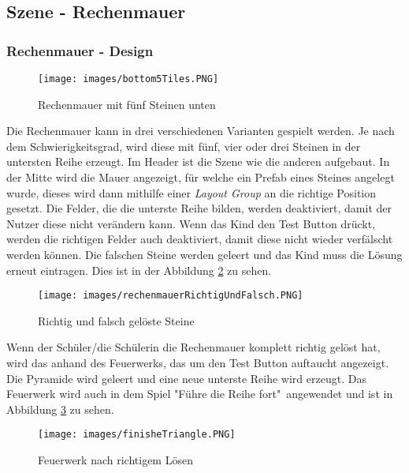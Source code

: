 \subsection{Szene - Rechenmauer}
\subsubsection{Rechenmauer - Design}
\begin{figure}[htbp]
  \centering
  \texttt{[image: images/bottom5Tiles.PNG]}
  \caption{Rechenmauer mit fünf Steinen unten}
  \label{triangle}
\end{figure}
Die Rechenmauer kann in drei verschiedenen Varianten gespielt werden. Je nach dem Schwierigkeitsgrad, wird diese mit fünf, vier oder drei Steinen in der untersten Reihe erzeugt. Im Header ist die Szene wie die anderen aufgebaut. In der Mitte wird die Mauer angezeigt, für welche ein Prefab eines Steines angelegt wurde, dieses wird dann mithilfe einer \textit{Layout Group} an die richtige Position gesetzt. Die Felder, die die unterste Reihe bilden, werden deaktiviert, damit der Nutzer diese nicht verändern kann. Wenn das Kind den Test Button drückt, werden die richtigen Felder auch deaktiviert, damit diese nicht wieder verfälscht werden können. Die falschen Steine werden geleert und das Kind muss die Lösung erneut eintragen. Dies ist in der Abbildung \ref{wrongAndRightStone} zu sehen.\\
\begin{figure}[htbp]
  \centering
  \texttt{[image: images/rechenmauerRichtigUndFalsch.PNG]}
  \caption{Richtig und falsch gelöste Steine}
  \label{wrongAndRightStone}
\end{figure}
Wenn der Schüler/die Schülerin die Rechenmauer komplett richtig gelöst hat, wird das anhand des Feuerwerks, das um den Test Button auftaucht angezeigt. Die Pyramide wird geleert und eine neue unterste Reihe wird erzeugt. Das Feuerwerk wird auch in dem Spiel "Führe die Reihe fort"\ angewendet und ist in Abbildung \ref{firework} zu sehen.
\begin{figure}[htbp]
  \centering
  \texttt{[image: images/finisheTriangle.PNG]}
  \caption{Feuerwerk nach richtigem Lösen}
  \label{firework}
\end{figure}
